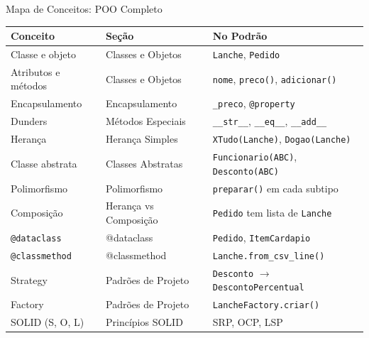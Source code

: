 \documentclass[aspectratio=169]{beamer}
\begin{document}
\begin{frame}{Mapa de Conceitos: POO Completo}
\begin{table}
\centering
\scriptsize
\begin{tabular}{lll}
\toprule
\textbf{Conceito} & \textbf{Seção} & \textbf{No Podrão} \\
\midrule
Classe e objeto          & Classes e Objetos & \texttt{Lanche}, \texttt{Pedido} \\
Atributos e métodos      & Classes e Objetos & \texttt{nome}, \texttt{preco()}, \texttt{adicionar()} \\
Encapsulamento           & Encapsulamento & \texttt{\_preco}, \texttt{@property} \\
Dunders                  & Métodos Especiais & \texttt{\_\_str\_\_}, \texttt{\_\_eq\_\_}, \texttt{\_\_add\_\_} \\
Herança                  & Herança Simples & \texttt{XTudo(Lanche)}, \texttt{Dogao(Lanche)} \\
Classe abstrata          & Classes Abstratas & \texttt{Funcionario(ABC)}, \texttt{Desconto(ABC)} \\
Polimorfismo             & Polimorfismo & \texttt{preparar()} em cada subtipo \\
Composição               & Herança vs Composição & \texttt{Pedido} tem lista de \texttt{Lanche} \\
\texttt{@dataclass}      & @dataclass & \texttt{Pedido}, \texttt{ItemCardapio} \\
\texttt{@classmethod}    & @classmethod & \texttt{Lanche.from\_csv\_line()} \\
Strategy                 & Padrões de Projeto & \texttt{Desconto} $\to$ \texttt{DescontoPercentual} \\
Factory                  & Padrões de Projeto & \texttt{LancheFactory.criar()} \\
SOLID (S, O, L)          & Princípios SOLID & SRP, OCP, LSP \\
\bottomrule
\end{tabular}
\end{table}
\end{frame}
\end{document}
